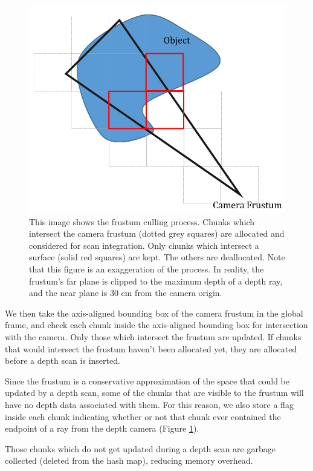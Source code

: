 \documentclass[conference,10pt]{IEEEtran}
\begin{document}
\begin{figure}[t]
  \centering
    \includegraphics[width=1.0\columnwidth]{img/frustum_cull}
      \caption{This image shows the frustum culling process. Chunks which
      intersect the camera frustum (dotted grey squares) are allocated and
      considered for scan integration. Only chunks which intersect a surface
      (solid red squares) are kept. The others are deallocated. Note that this
      figure is an exaggeration of the process. In reality, the frustum's far
      plane is clipped to the maximum depth of a depth ray, and the near plane is 30 cm
      from the camera origin.}
  \label{fig:frustum_cull}
\end{figure}


We then take the axis-aligned bounding box of the camera frustum in the global
frame, and check each chunk inside the axis-aligned bounding box for 
intersection with the camera. Only those which intersect the frustum are
updated. If chunks that would intersect the frustum haven't been allocated yet,
they are allocated before a depth scan is inserted.

Since the frustum is a conservative approximation of the space that could be
updated by a depth scan, some of the chunks that are visible to the frustum will
have no depth data associated with them. For this reason, we also store a flag
inside each chunk indicating whether or not that chunk ever contained the
endpoint of a ray from the depth camera (Figure \ref{fig:frustum_cull}).

Those chunks which do not get updated during a depth scan are garbage collected
(deleted from the hash map), reducing memory overhead.
\end{document}
